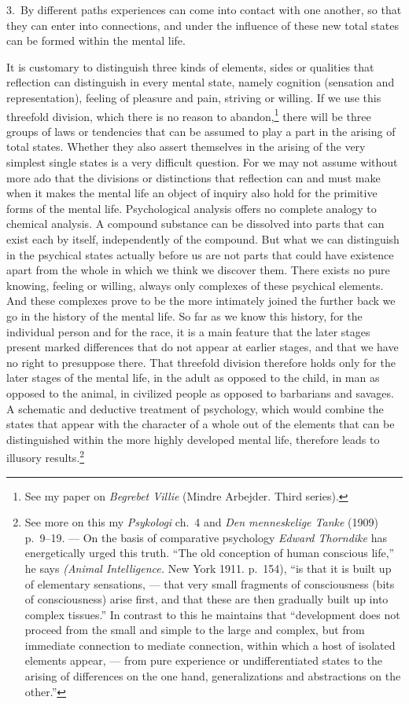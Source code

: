 \documentclass[12pt]{book}
\newcommand{\opage}[1]{\marginnote{\footnotesize\textit{[#1]}}}
\begin{document}
3.~By different paths experiences can come into contact with one another, so
that they can enter into connections, and under the influence of these new total
states can be formed within the mental life.

It is customary to distinguish three kinds of elements, sides or qualities that
reflection can distinguish in every mental state, namely cognition (sensation and
representation), feeling of pleasure and pain, striving or willing. If we use
this threefold division, which there is no reason to abandon,\footnote{See my
paper on \textit{Begrebet Villie} (Mindre Arbejder. Third series).} there will
be three groups of laws or tendencies that can be assumed to play a part in the
arising of total states. Whether they also \opage{16}assert themselves in the
arising of the very simplest single states is a very difficult question. For we
may not assume without more ado that the divisions or distinctions that
reflection can and must make when it makes the mental life an object of inquiry
also hold for the primitive forms of the mental life. Psychological analysis
offers no complete analogy to chemical analysis. A compound substance can be
dissolved into parts that can exist each by itself, independently of the
compound. But what we can distinguish in the psychical states actually before us
are not parts that could have existence apart from the whole in which we think
we discover them. There exists no pure knowing, feeling or willing, always only
complexes of these psychical elements. And these complexes prove to be the more
intimately joined the further back we go in the history of the mental life. So
far as we know this history, for the individual person and for the race, it is a
main feature that the later stages present marked differences that do not appear
at earlier stages, and that we have no right to presuppose there. That threefold
division therefore holds only for the later stages of the mental life, in the
adult as opposed to the child, in man as opposed to the animal, in civilized
people as opposed to barbarians and savages. A schematic and deductive treatment
of psychology, which would combine the states that appear with the character of a
whole out of the elements that can be distinguished within the more highly
developed mental life, therefore leads to illusory results.\footnote{See more
on this my \textit{Psykologi} ch.~4 and \textit{Den menneskelige Tanke} (1909)
p.~9--19. --- On the basis of comparative psychology \textit{Edward Thorndike}
has energetically urged this truth. ``The old conception of human conscious
life,'' he says \textit{(Animal Intelligence.} New York 1911. p.~154), %
``is that it is built up of elementary sensations, --- that very small fragments
of consciousness (bits of consciousness) arise first, and that these are then
gradually built up into complex tissues.'' In contrast to this he maintains that
``development does not proceed from the small and simple to the large and
complex, but from immediate connection to mediate connection, within which a
host of isolated elements appear, --- from pure experience or undifferentiated
states to the arising of differences on the one hand, generalizations and
abstractions on the other.''}
\end{document}
